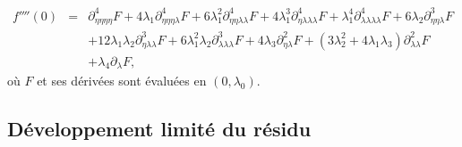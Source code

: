 \documentclass{article}
\newcommand{\nocomma}{}
\begin{document}
\begin{eqnarray}
  f'''' (0) & = & \partial_{\eta \nocomma \eta \nocomma \eta \nocomma \eta}^4
  F + 4 \lambda_1 \partial_{\eta \nocomma \eta \nocomma \eta \nocomma
  \lambda}^4 F + 6 \lambda_1^2 \partial_{\eta \nocomma \eta \nocomma \lambda
  \nocomma \lambda}^4 F + 4 \lambda_1^3 \partial_{\eta \nocomma \lambda
  \nocomma \lambda \nocomma \lambda}^4 F + \lambda_1^4 \partial_{\lambda
  \nocomma \lambda \nocomma \lambda \nocomma \lambda}^4 F + 6 \lambda_2
  \partial_{\eta \nocomma \eta \nocomma \lambda}^3 F \nonumber\\
  &  & + 12 \lambda_1 \lambda_2 \partial_{\eta \nocomma \lambda \nocomma
  \lambda}^3 F + 6 \lambda_1^2 \lambda_2 \partial_{\lambda \nocomma \lambda
  \nocomma \lambda}^3 F + 4 \lambda_3 \partial_{\eta \nocomma \lambda}^2 F +
  (3 \lambda_2^2 + 4 \lambda_1 \lambda_3) \partial_{\lambda \nocomma
  \lambda}^2 F \nonumber\\
  &  & + \lambda_4 \partial_{\lambda} F,
\end{eqnarray}
où $F$ et ses dérivées sont évaluées en $(0, \lambda_0)$.

\subsection{Développement limité du
résidu}\label{sec20211112182000}
\end{document}
